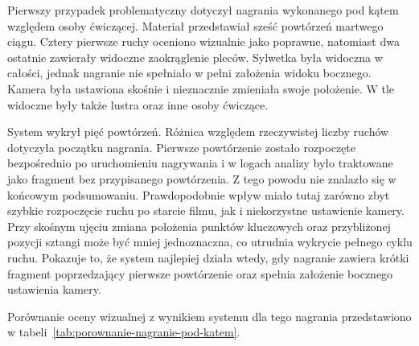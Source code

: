Pierwszy przypadek problematyczny dotyczył nagrania wykonanego pod kątem względem osoby ćwiczącej. Materiał przedstawiał sześć powtórzeń martwego ciągu. Cztery pierwsze ruchy oceniono wizualnie jako poprawne, natomiast dwa ostatnie zawierały widoczne zaokrąglenie pleców. Sylwetka była widoczna w całości, jednak nagranie nie spełniało w pełni założenia widoku bocznego. Kamera była ustawiona skośnie i nieznacznie zmieniała swoje położenie. W tle widoczne były także lustra oraz inne osoby ćwiczące.

System wykrył pięć powtórzeń. Różnica względem rzeczywistej liczby ruchów dotyczyła początku nagrania. Pierwsze powtórzenie zostało rozpoczęte bezpośrednio po uruchomieniu nagrywania i w logach analizy było traktowane jako fragment bez przypisanego powtórzenia. Z tego powodu nie znalazło się w końcowym podsumowaniu. Prawdopodobnie wpływ miało tutaj zarówno zbyt szybkie rozpoczęcie ruchu po starcie filmu, jak i niekorzystne ustawienie kamery. Przy skośnym ujęciu zmiana położenia punktów kluczowych oraz przybliżonej pozycji sztangi może być mniej jednoznaczna, co utrudnia wykrycie pełnego cyklu ruchu. Pokazuje to, że system najlepiej działa wtedy, gdy nagranie zawiera krótki fragment poprzedzający pierwsze powtórzenie oraz spełnia założenie bocznego ustawienia kamery.

Porównanie oceny wizualnej z wynikiem systemu dla tego nagrania przedstawiono w tabeli~\ref{tab:porownanie-nagranie-pod-katem}.

